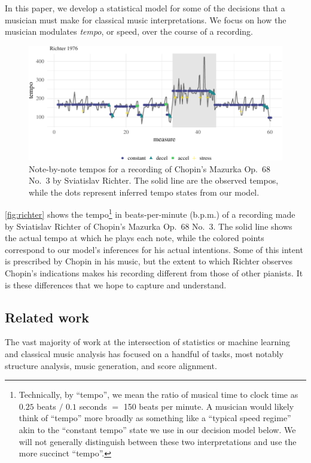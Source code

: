 \documentclass[aoas]{imsart}
\begin{document}
In this paper, we develop a statistical model for some of the
decisions that a musician must make for classical music
interpretations. We focus on how the musician modulates
{\it tempo}, or speed, over the course of a recording. 
\begin{figure}[t]
  \centering
  \includegraphics[width=.9\linewidth]{richter-1}
  \caption{Note-by-note tempos for a recording of Chopin's Mazurka
    Op.\ 68 No.\ 3 by Sviatislav Richter. The solid line are the
    observed tempos, while the dots represent inferred tempo states
    from our model. }
  \label{fig:richter}
\end{figure}
\autoref{fig:richter} shows the tempo\footnote{Technically, by
  ``tempo'', we mean the ratio of musical time to clock time as $0.25$
  beats $/$ $0.1$ seconds $=$ 150 beats per minute. A musician would
  likely think of ``tempo'' more broadly as something like a ``typical
  speed regime'' akin to the ``constant tempo'' state we use in our
  decision model below. We will not generally distinguish between
  these two interpretations and use the more succinct ``tempo''.}
  in beats-per-minute (b.p.m.) of
a recording made by Sviatislav Richter of Chopin's Mazurka Op.\ 68
No.\ 3. The solid line shows the actual tempo at which he plays each
note, while the colored points correspond to our model's inferences
for his actual intentions. Some of this intent is prescribed  by
Chopin in his music, but the extent to which Richter observes Chopin's
indications makes his recording different from those of other
pianists. It is these differences that we hope to capture and understand.

\subsection{Related work}
\label{sec:related-work}


 
The vast majority of work at the intersection of statistics or machine
learning and classical music analysis has focused on a handful of tasks,
most notably structure analysis, music generation, and score
alignment.
\end{document}
